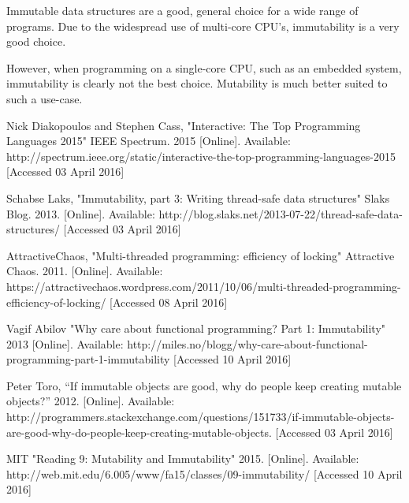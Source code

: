 \documentclass[11pt]{article}
\begin{document}
Immutable data structures are a good, general choice for a wide range of
programs. Due to the widespread use of multi-core CPU's, immutability is a
very good choice.

However, when programming on a single-core CPU, such as an embedded system,
immutability is clearly not the best choice. Mutability is much better suited to
such a use-case.

\clearpage

\begin{thebibliography}{9}

  Nick Diakopoulos and Stephen Cass,
  "Interactive: The Top Programming Languages 2015"
  IEEE Spectrum.
  2015
  [Online].
  Available: http://spectrum.ieee.org/static/interactive-the-top-programming-languages-2015
  [Accessed 03 April 2016]

  Schabse Laks,
  "Immutability, part 3: Writing thread-safe data structures"
  Slaks Blog.
  2013.
  [Online].
  Available: http://blog.slaks.net/2013-07-22/thread-safe-data-structures/
  [Accessed 03 April 2016]

  AttractiveChaos,
  "Multi-threaded programming: efficiency of locking"
  Attractive Chaos.
  2011.
  [Online].
  Available: https://attractivechaos.wordpress.com/2011/10/06/multi-threaded-programming-efficiency-of-locking/
  [Accessed 08 April 2016]

	Vagif Abilov
	"Why care about functional programming? Part 1: Immutability"
	2013
	[Online].
	Available: http://miles.no/blogg/why-care-about-functional-programming-part-1-immutability
	[Accessed 10 April 2016]

	Peter Toro,
	“If immutable objects are good, why do people keep creating mutable objects?”
	2012.
	[Online].
	Available: http://programmers.stackexchange.com/questions/151733/if-immutable-objects-are-good-why-do-people-keep-creating-mutable-objects.
	[Accessed 03 April 2016]

	MIT
	"Reading 9: Mutability and Immutability"
	2015.
	[Online].
	Available: http://web.mit.edu/6.005/www/fa15/classes/09-immutability/
	[Accessed 10 April 2016]

\end{thebibliography}
\end{document}
